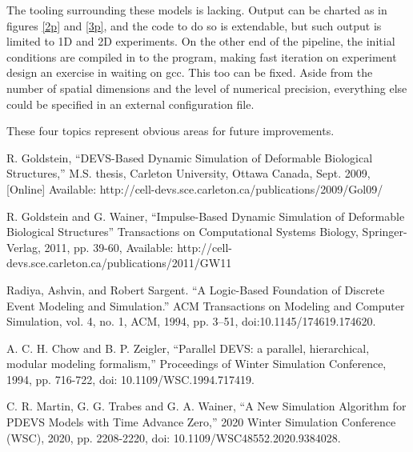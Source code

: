 \documentclass[conference]{IEEEtran}
\begin{document}
The tooling surrounding these models is lacking. Output can be charted as in figures \ref{2p} and \ref{3p}, and the code to do so is extendable, but such output is limited to 1D and 2D experiments. On the other end of the pipeline, the initial conditions are compiled in to the program, making fast iteration on experiment design an exercise in waiting on gcc. This too can be fixed. Aside from the number of spatial dimensions and the level of numerical precision, everything else could be specified in an external configuration file.

These four topics represent obvious areas for future improvements.

\begin{thebibliography}{00}
	
	 R. Goldstein, ``DEVS-Based Dynamic Simulation of Deformable Biological Structures,''  M.S. thesis, Carleton University, Ottawa Canada, Sept. 2009, [Online] Available: http://cell-devs.sce.carleton.ca/publications/2009/Gol09/
	
	 R. Goldstein and G. Wainer, ``Impulse-Based Dynamic Simulation of Deformable Biological Structures'' Transactions on Computational Systems Biology, Springer-Verlag, 2011, pp. 39-60, Available: http://cell-devs.sce.carleton.ca/publications/2011/GW11
	
	 Radiya, Ashvin, and Robert Sargent. ``A Logic-Based Foundation of Discrete Event Modeling and Simulation.'' ACM Transactions on Modeling and Computer Simulation, vol. 4, no. 1, ACM, 1994, pp. 3–51, doi:10.1145/174619.174620.
	
	A. C. H. Chow and B. P. Zeigler, ``Parallel DEVS: a parallel, hierarchical, modular modeling formalism,'' Proceedings of Winter Simulation Conference, 1994, pp. 716-722, doi: 10.1109/WSC.1994.717419.
	
	 C. R. Martin, G. G. Trabes and G. A. Wainer, ``A New Simulation Algorithm for PDEVS Models with Time Advance Zero,'' 2020 Winter Simulation Conference (WSC), 2020, pp. 2208-2220, doi: 10.1109/WSC48552.2020.9384028.
	
\end{thebibliography}
\end{document}
